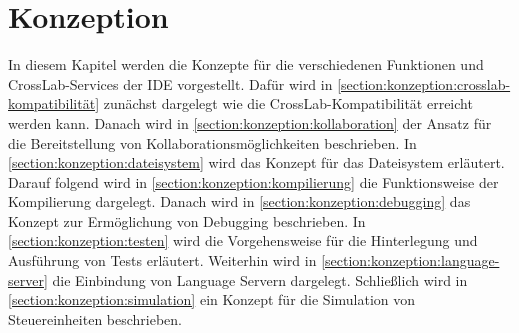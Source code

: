 \chapter{Konzeption}\label{section:konzeption}

In diesem Kapitel werden die Konzepte für die verschiedenen Funktionen und CrossLab-Services der IDE vorgestellt. Dafür wird in \autoref{section:konzeption:crosslab-kompatibilität} zunächst dargelegt wie die CrossLab-Kompatibilität erreicht werden kann. Danach wird in \autoref{section:konzeption:kollaboration} der Ansatz für die Bereitstellung von Kollaborationsmöglichkeiten beschrieben. In \autoref{section:konzeption:dateisystem} wird das Konzept für das Dateisystem erläutert. Darauf folgend wird in \autoref{section:konzeption:kompilierung} die Funktionsweise der Kompilierung dargelegt. Danach wird in \autoref{section:konzeption:debugging} das Konzept zur Ermöglichung von Debugging beschrieben. In \autoref{section:konzeption:testen} wird die Vorgehensweise für die Hinterlegung und Ausführung von Tests erläutert. Weiterhin wird in \autoref{section:konzeption:language-server} die Einbindung von Language Servern dargelegt. Schließlich wird in \autoref{section:konzeption:simulation} ein Konzept für die Simulation von Steuereinheiten beschrieben.








